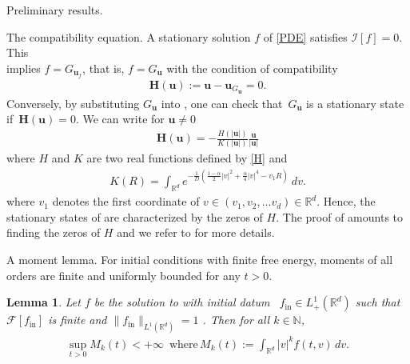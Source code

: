 \documentclass[reqno]{amsart} %
\newtheorem{lemma}{Lemma}[section]
\begin{document}
\begin{section}{Preliminary results.}
\begin{subsection}{The compatibility equation.}
A stationary solution $f$ of \eqref{PDE} satisfies $\mathcal{I}[f]=0$. This \\ implies  $f=G_{\mathbf{u}_{f}}$, that is, $f=G_\mathbf{u}$ with the condition of compatibility
\begin{align}
\label{compatibilityequation}
    \mathbf{H}(\mathbf{u}):=\mathbf{u}-\mathbf{u}_{G_\mathbf{u}}=0.
\end{align}  Conversely, by substituting  $G_\mathbf{u}$ into , one can check that~$G_\mathbf{u}$ is a stationary state \\ if~\hbox{$\mathbf{H}(\mathbf{u})=0$.} 
We can write for $\mathbf{u} \neq 0$ \begin{align}
\label{relationimp}
    \mathbf{H}(\mathbf{u})=-\frac{H(|\mathbf{u}|)}{K(|\mathbf{u}|)} \frac{\mathbf{u}}{|\mathbf{u}|}
\end{align}
where $H$ and $K$ are two real functions defined by \eqref{H} and 
\begin{align}
\label{K}
    {K}(R)= \int_{\mathbb{R}^d}{e^{-\frac{1}{D}\left(\frac{1-\alpha}{2}|v|^2+ \frac{\alpha}{4} |v|^4-v_1R\right)}}\ dv.
\end{align}
where $v_1$ denotes the first coordinate of $v\in (v_1,v_2,...v_d) \in \mathbb{R}^d$.
Hence, the stationary states of  are characterized by the zeros of $H$. The proof of  amounts to finding the zeros of $H$ and we refer to \cite{Li2021} for more details. 
\end{subsection}

\begin{subsection}{A moment lemma.}
For initial conditions with finite free energy, moments of all orders are finite and  uniformly bounded for any $t>0$.
    \begin{lemma}
    \label{lemmedesmoments}
     Let $f$ be the solution to  with initial datum ~$f_{\mathrm{in}} \in L^1_+(\mathbb{R}^d)$ such \mbox{that~$\mathcal{F}[f_{\mathrm{in}}]$} is finite and  $\| f_{\mathrm{in}}\|_{L^1(\mathbb{R}^d)}=1$ . Then for all  $k\in \mathbb{N}$, \begin{align*}
         \sup_{t>0}M_k(t)<+\infty \,\,\,\text{where} \,M_k(t):=\int_{\mathbb{R}^d} |v|^kf(t,v)\,dv.
     \end{align*}


\end{lemma}
\end{subsection}
\end{section}
\end{document}
